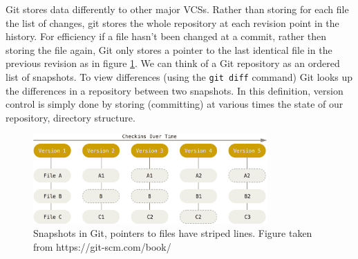 \documentclass[12pt,twoside,notitlepage]{report}
\begin{document}
Git stores data differently to other major VCSs. Rather than storing for each file the list of changes, git stores the whole repository at each revision point in the history. For efficiency if a file hasn't been changed at a commit, rather then storing the file again, Git only stores a pointer to the last identical file in the previous revision as in figure \ref{snapshot_git}. We can think of a Git repository as an ordered list of snapshots. To view differences (using the \texttt{git diff} command) Git looks up the differences in a repository between two snapshots. In this definition, version control is simply done by storing (committing) at various times the state of our repository, directory structure.
\begin{figure}[h]
\includegraphics[width=0.8\textwidth]{snapshots_git.png}
\centering
\captionsetup{width=0.8\textwidth}

\caption[Snapshots in Git]{Snapshots in Git, pointers to files have striped lines. Figure taken from https://git-scm.com/book/}
\label{snapshot_git}
\end{figure}
\end{document}
